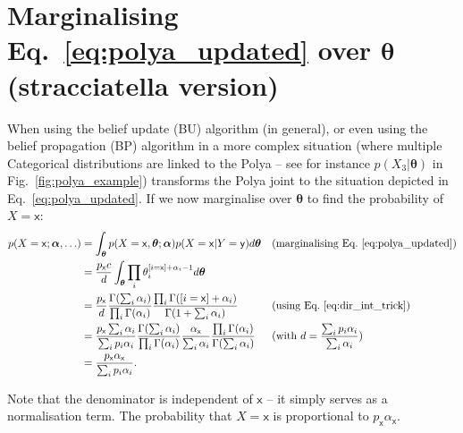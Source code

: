 \documentclass[oneside,english]{scrbook}
\begin{document}
\section{Marginalising Eq.~\ref{eq:polya_updated} over $\bm{\theta}$ (stracciatella version)}
When using the belief update (BU) algorithm (in general), or even
using the belief propagation (BP) algorithm in a more complex
situation (where multiple Categorical distributions are linked to the
Polya -- see for instance $p(X_3|\bm{\theta})$ in
Fig.~\ref{fig:polya_example}) transforms the Polya joint to the
situation depicted in Eq.~\ref{eq:polya_updated}. If we now
marginalise over $\bm{\theta}$ to find the probability of
$X=\mathsf{x}$:
\begin{align}
  p(X=\mathsf{x};\bm{\alpha},\ldots)
  &= \int_{\bm{\theta}} p(X=\mathsf{x},\bm{\theta};\bm{\alpha})p(X=\mathsf{x}|Y=\mathsf{y})d\bm{\theta}
  && \text{(marginalising Eq.~\ref{eq:polya_updated})} \notag\\
  &= \frac{p_\mathsf{x}c}{d}\int_{\bm{\theta}}\prod_i \theta_i^{[i=\mathsf{x}]+\alpha_i-1} d\bm{\theta} \notag\\
  &= \frac{p_\mathsf{x}}{d}\frac{\Gamma(\sum_i\alpha_i)}{\prod_i\Gamma(\alpha_i)}
  \frac{\prod_i\Gamma([i=\mathsf{x}] + \alpha_i)}{\Gamma(1+\sum_i\alpha_i)}
  && \text{(using Eq.~\ref{eq:dir_int_trick})}\notag\\
  &= \frac{p_\mathsf{x}\sum_i\alpha_i}{\sum_ip_i\alpha_i}\frac{\Gamma(\sum_i\alpha_i)}{\prod_i\Gamma(\alpha_i)}
  \frac{\alpha_\mathsf{x}}{\sum_i\alpha_i}\frac{\prod_i\Gamma(\alpha_i)}{\Gamma(\sum_i\alpha_i)}
  && (\text{with } d = \frac{\sum_ip_i\alpha_i}{\sum_i\alpha_i})\notag\\
     &= \frac{p_\mathsf{x}\alpha_\mathsf{x}}{\sum_ip_i\alpha_i} \label{eq:marg_theta_strac}.
\end{align}

Note that the denominator is independent of $\mathsf{x}$ -- it simply
serves as a normalisation term. The probability that $X=\mathsf{x}$ is
proportional to $p_\mathsf{x}\alpha_\mathsf{x}$.
\end{document}
